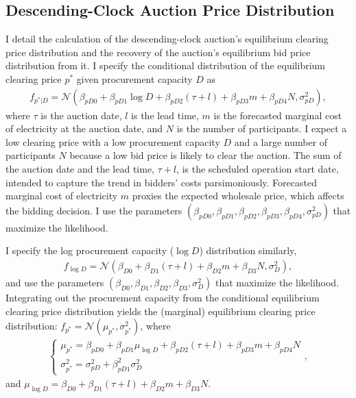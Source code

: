 \documentclass[12pt]{article}
\theoremstyle{definition} %
\begin{document}
\subsection{Descending-Clock Auction Price Distribution}
\label{sec:dcprice}

I detail the calculation of the descending-clock auction's equilibrium clearing price distribution and the recovery of the auction's equilibrium bid price distribution from it. I specify the conditional distribution of the equilibrium clearing price $p^\ast$ given procurement capacity $D$ as
\begin{align*}
f_{p^\ast | D} = \mathcal{N}(\beta_{pD 0} + \beta_{pD 1} \log D + \beta_{pD 2} (\tau+l) + \beta_{pD 3} m + \beta_{pD 4} N,\sigma_{pD}^2),
\end{align*}
where $\tau$ is the auction date, $l $ is the lead time, $m$ is the forecasted marginal cost of electricity at the auction date, and $N$ is the number of participants. I expect a low clearing price with a low procurement capacity $D$ and a large number of participants $N $ because a low bid price is likely to clear the auction. The sum of the auction date and the lead time, $\tau+l$, is the scheduled operation start date, intended to capture the trend in bidders' costs parsimoniously. Forecasted marginal cost of electricity $m $ proxies the expected wholesale price, which affects the bidding decision. I use the parameters $(\beta_{pD 0},\beta_{pD 1},\beta_{pD 2},\beta_{pD 3},\beta_{pD 4},\sigma_{pD}^2) $ that maximize the likelihood.

I specify the log procurement capacity ($\log D$) distribution similarly,
\begin{align}
\label{eq:proccapacity}
f_{\log D} = \mathcal{N}(\beta_{D 0} + \beta_{D 1} (\tau+l) + \beta_{D 2} m + \beta_{D 3} N,\sigma_D^2),
\end{align}
and use the parameters $(\beta_{D 0},\beta_{D 1},\beta_{D 2},\beta_{D 3},\sigma_D^2) $ that maximize the likelihood. Integrating out the procurement capacity from the conditional equilibrium clearing price distribution yields the (marginal) equilibrium clearing price distribution: $f_{p^\ast} = \mathcal{N}(\mu_{p^\ast},\sigma_{p^\ast}^2) $, where
\begin{align*}
\begin{cases}
\mu_{p^\ast} = \beta_{pD 0} + \beta_{pD 1} \mu_{\log D} + \beta_{pD 2} (\tau+l) + \beta_{pD 3} m + \beta_{pD 4} N\\
\sigma_{p^\ast}^2 = \sigma_{pD}^2 + \beta_{pD 1}^2 \sigma_D^2
\end{cases},
\end{align*}
and $\mu_{\log D} = \beta_{D 0} + \beta_{D 1} (\tau+l) + \beta_{D 2} m + \beta_{D 3} N $.
\end{document}
